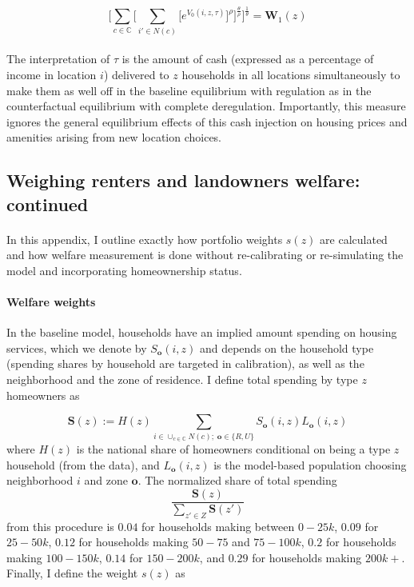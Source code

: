 \documentclass[12pt]{article}
\begin{document}
	\begin{equation}\label{Welfare}
	 \bigg[\sum_{c \in \mathbb{C}} \bigg[\sum_{i' \in N(c)}\big[e^{V_{0}(i, z, \tau )}\big]^{\rho}\bigg]^{\frac{\theta}{\rho}}\bigg]^{\frac{1}{\theta}}	= \boldsymbol{W}_{1}(z)
	\end{equation}
	
	\paragraph*{}
	The interpretation of $\tau$ is the amount of cash (expressed as a percentage of income in location $i$) delivered to $z$ households in all locations simultaneously to make them as well off in the baseline equilibrium with regulation as in the counterfactual equilibrium with complete deregulation. Importantly, this measure ignores the general equilibrium effects of this cash injection on housing prices and amenities arising from new location choices.
	
	
	
	\clearpage
	
	\subsection{Weighing renters and landowners welfare: continued}\label{Appendix:RenterLandownerWelfare}
	
	\paragraph*{}
	In this appendix, I outline exactly how portfolio weights $s(z)$ are calculated and how welfare measurement is done without re-calibrating or re-simulating the model and incorporating homeownership status. 
	
	\paragraph*{Welfare weights}
	In the baseline model, households have an implied amount spending on housing services, which we denote by $S_{\boldsymbol{o}}(i, z)$ and depends on the household type (spending shares by household are targeted in calibration), as well as the neighborhood and the zone of residence. I define total spending by type $z$ homeowners as 
	
	\begin{equation*}
		\boldsymbol{S}(z) := H(z)\sum_{i \in \cup_{c \in \mathbb{C}}N(c); \; \boldsymbol{o} \in \{R, U\}} S_{\boldsymbol{o}}(i, z)L_{\boldsymbol{o}}(i, z)
	\end{equation*}
	where $H(z)$ is the national share of homeowners conditional on being a type $z$ household (from the data), and $L_{\boldsymbol{o}}(i, z)$ is the model-based population choosing neighborhood $i$ and zone $\boldsymbol{o}$. The normalized share of total spending $$ \frac{\boldsymbol{S}(z)}{\sum_{z' \in Z}\boldsymbol{S}(z')} $$ from this procedure is $0.04$ for households making between $0-25k$, $0.09$ for $25-50k$, $0.12$ for households making $50-75$ and $75-100k$, $0.2$ for households making $100-150k$, $0.14$ for $150-200k$, and $0.29$ for households making $200k+$. Finally, I define the weight $s(z)$ as 
	
\end{document}
